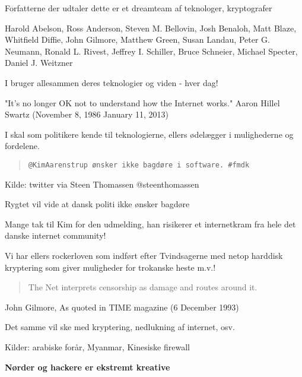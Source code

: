 \documentclass[20pt,landscape,a4paper,footrule]{foils}
\begin{document}
Forfatterne der udtaler dette er et dreamteam af teknologer, kryptografer

Harold Abelson, Ross Anderson, Steven M. Bellovin, Josh Benaloh, Matt Blaze,
Whitfield Diffie, John Gilmore, Matthew Green, Susan Landau, Peter G. Neumann,
Ronald L. Rivest, Jeffrey I. Schiller, Bruce Schneier, Michael Specter, Daniel J. Weitzner

I bruger allesammen deres teknologier og viden - hver dag!




"It's no longer OK not to understand how the Internet works."
Aaron Hillel Swartz (November 8, 1986  January 11, 2013)

I skal som politikere kende til teknologierne, ellers ødelægger i mulighederne og fordelene.





\begin{quote}
\verb+@KimAarenstrup ønsker ikke bagdøre i software. #fmdk+
\end{quote}
Kilde: twitter via Steen Thomassen @steenthomassen\\

Rygtet vil vide at dansk politi ikke ønsker bagdøre

Mange tak til Kim for den udmelding, han risikerer et internetkram
fra hele det danske internet community!

Vi har ellers rockerloven som indført efter Tvindsagerne med netop
harddisk kryptering som giver muligheder for trokanske heste m.v.!



\begin{quote}
  The Net interprets censorship as damage and routes around it.
\end{quote}
John Gilmore, As quoted in TIME magazine (6 December 1993)

Det samme vil ske med kryptering, nedlukning af internet, osv.

Kilder: arabiske forår, Myanmar, Kinesiske firewall

\vskip 1cm
\centerline{\bf Nørder og hackere er ekstremt kreative}



\end{document}
